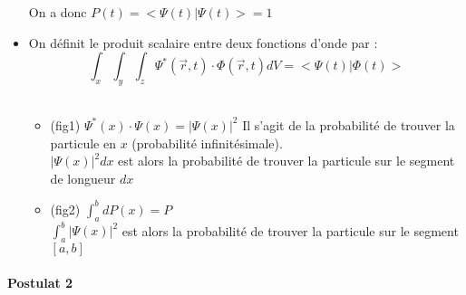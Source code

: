 \documentclass[../main.tex]{subfile}
\begin{document}
\begin{itemize}
      On a donc $P(t) = <\Psi(t) | \Psi(t) > = 1$


   \item On définit le produit scalaire entre deux fonctions d'onde par :
      $$\int_x \int_y \int_z \Psi^*(\vec{r}, t) \cdot \Phi(\vec{r}, t) dV = <\Psi(t) | \Phi(t)>$$
      \begin{ex} 
         $\phantom{a}$
         \begin{itemize} 
            \item (fig1) $\Psi^*(x) \cdot \Psi(x) = |\Psi(x)|^2$
               Il s'agit de la probabilité de trouver la particule en $x$ (probabilité infinitésimale).\\
               $|\Psi(x)|^2 dx$ est alors la probabilité de trouver la particule sur le segment de longueur $dx$
            
            \item (fig2) $\int_a^b dP(x) = P$\\
               $\int_a^b |\Psi(x)|^2$ est alors la probabilité de trouver la particule sur le segment $[a,b]$
         \end{itemize}
      \end{ex}
\end{itemize}

\paragraph{Postulat 2}
\end{document}
